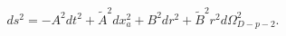 \begin{equation}
ds^{2}=-A^{2} dt^{2} + \tilde{A}^{2} dx_{a}^{2}
+B^{2}dr^{2} +\tilde{B}^{2}r^{2}d\Omega_{D-p-2}^{2}.
\label{eq:pbr1}
\end{equation}

